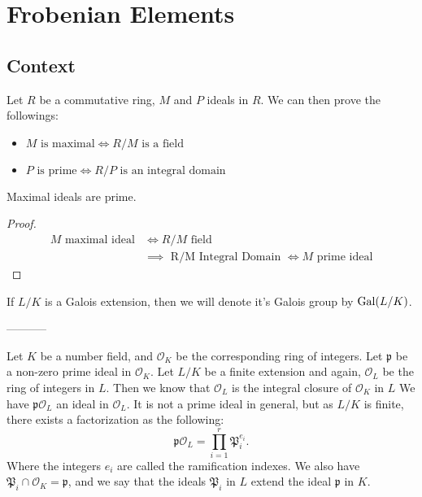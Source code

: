 \section{Frobenian Elements}
\subsection{Context}
Let $R$ be a commutative ring, $M$ and $P$ ideals in $R$. We can then prove the followings:
\begin{theorem}
    \begin{itemize}
        \item $M \text{ is maximal} \iff R/M \text{ is a field}$
        \item $P \text{ is prime} \iff R/P \text{ is an integral domain}$
    \end{itemize}
\end{theorem}
\begin{property}
    Maximal ideals are prime. 
\end{property}
\begin{proof}
    \begin{align*}
        M \text{ maximal ideal} &\iff R/M \text{ field}\\
                                &\implies \text{ R/M Integral Domain } \iff M \text{ prime ideal}
    \end{align*}
\end{proof}

If $L/K$ is a Galois extension, then we will denote it's Galois group by $\text{Gal}(L/K)$.



-----------



Let $K$ be a number field, and $\mathcal{O}_K$ be the corresponding ring of integers.
Let $\mathfrak{p}$ be a non-zero prime ideal in $\mathcal{O}_K$.
Let $L/K$ be a finite extension and again, $\mathcal{O}_L$ be the ring of integers in $L$.
Then we know that $\mathcal{O}_L$ is the integral closure of $\mathcal{O}_K$ in $L$
We have $\mathfrak{p}\mathcal{O}_L$ an ideal in $\mathcal{O}_L$.
It is not a prime ideal in general, but as $L/K$ is finite, there exists a factorization as the following:
$$
\mathfrak{p}\mathcal{O}_L = \prod_{i=1}^r \mathfrak{P}_i^{e_i}.
$$
Where the integers $e_i$ are called the ramification indexes.
We also have $\mathfrak{P}_i \cap \mathcal{O}_K = \mathfrak{p}$, and we say that the ideals $\mathfrak{P}_i$ in $L$ extend the ideal $\mathfrak{p}$ in $K$.

